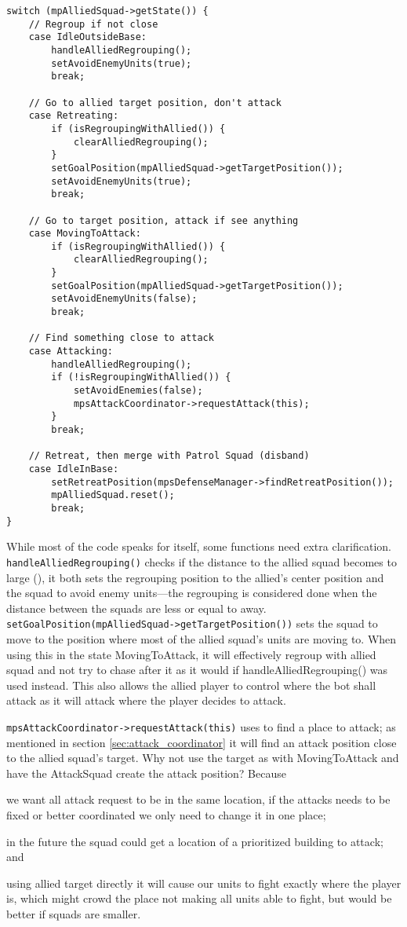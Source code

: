\begin{lstlisting}[caption={Squad actions depending on the allied squad's state.},label={lst:attack_follow_allied}]
switch (mpAlliedSquad->getState()) {
	// Regroup if not close
	case IdleOutsideBase:
		handleAlliedRegrouping();
		setAvoidEnemyUnits(true);
		break;
	
	// Go to allied target position, don't attack
	case Retreating:
		if (isRegroupingWithAllied()) {
			clearAlliedRegrouping();
		}
		setGoalPosition(mpAlliedSquad->getTargetPosition());
		setAvoidEnemyUnits(true);
		break;

	// Go to target position, attack if see anything
	case MovingToAttack: 
		if (isRegroupingWithAllied()) {
			clearAlliedRegrouping();
		}
		setGoalPosition(mpAlliedSquad->getTargetPosition());
		setAvoidEnemyUnits(false);
		break;

	// Find something close to attack
	case Attacking:
		handleAlliedRegrouping();
		if (!isRegroupingWithAllied()) {
			setAvoidEnemies(false);
			mpsAttackCoordinator->requestAttack(this);
		}
		break;

	// Retreat, then merge with Patrol Squad (disband)
	case IdleInBase:
		setRetreatPosition(mpsDefenseManager->findRetreatPosition());
		mpAlliedSquad.reset();
		break;
}
\end{lstlisting}
While most of the code speaks for itself, some functions need extra clarification. \texttt{handleAlliedRegrouping()} checks if the distance to the allied squad becomes to large (\squadAttackAlliedRegroupBegin), it both sets the regrouping position to the allied's center position and the squad to avoid enemy units—the regrouping is considered done when the distance between the squads are less or equal to \squadAttackAlliedRegroupEnd away. \texttt{setGoalPosition(mpAlliedSquad->getTargetPosition())} sets the squad to move to the position where most of the allied squad's units are moving to. When using this in the state MovingToAttack, it will effectively regroup with allied squad and not try to chase after it as it would if handleAlliedRegrouping() was used instead. This also allows the allied player to control where the bot shall attack as it will attack where the player decides to attack.

\texttt{mpsAttackCoordinator->requestAttack(this)} uses  to find a place to attack; as mentioned in section \ref{sec:attack_coordinator} it will find an attack position close to the allied squad's target. Why not use the target as with MovingToAttack and have the AttackSquad create the attack position? Because
\begin{inparaenum}[1\upshape)]
	\item we want all attack request to be in the same location, if the attacks needs to be fixed or better coordinated we only need to change it in one place;
	\item in the future the squad could get a location of a prioritized building to attack; and
	\item using allied target directly it will cause our units to fight exactly where the player is, which might crowd the place not making all units able to fight, but would be better if squads are smaller.
\end{inparaenum}

